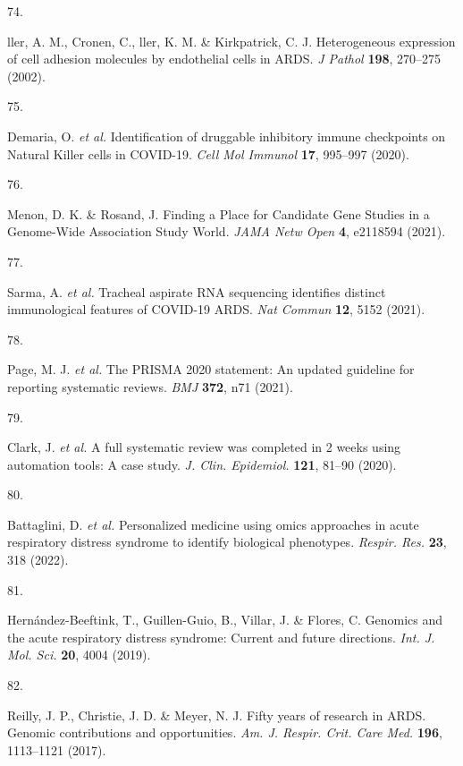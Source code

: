 \documentclass[
  11,
  a4paper,
]{article}
\newlength{\cslhangindent}
\newlength{\csllabelwidth}
\newlength{\cslentryspacingunit} %
\newenvironment{CSLReferences}[2] %
 {%
  \setlength{\parindent}{0pt}
  \ifodd #1
  \let\oldpar\par
  \def\par{\hangindent=\cslhangindent\oldpar}
  \fi
  \setlength{\parskip}{#2\cslentryspacingunit}
 }%
 {}
\newcommand{\CSLLeftMargin}[1]{\parbox[t]{\csllabelwidth}{#1}}
\newcommand{\CSLRightInline}[1]{\parbox[t]{\linewidth - \csllabelwidth}{#1}\break}
\begin{document}
\begin{CSLReferences}{0}{0}
\leavevmode{}%
\CSLLeftMargin{74. }%
\CSLRightInline{ller, A. M., Cronen, C., ller, K. M. \& Kirkpatrick, C.
J. {{H}eterogeneous expression of cell adhesion molecules by endothelial
cells in {A}{R}{D}{S}}. \emph{J Pathol} \textbf{198}, 270--275 (2002).}

\leavevmode{}%
\CSLLeftMargin{75. }%
\CSLRightInline{Demaria, O. \emph{et al.} {{I}dentification of druggable
inhibitory immune checkpoints on {N}atural {K}iller cells in
{C}{O}{V}{I}{D}-19}. \emph{Cell Mol Immunol} \textbf{17}, 995--997
(2020).}

\leavevmode{}%
\CSLLeftMargin{76. }%
\CSLRightInline{Menon, D. K. \& Rosand, J. {{F}inding a {P}lace for
{C}andidate {G}ene {S}tudies in a {G}enome-{W}ide {A}ssociation {S}tudy
{W}orld}. \emph{JAMA Netw Open} \textbf{4}, e2118594 (2021).}

\leavevmode{}%
\CSLLeftMargin{77. }%
\CSLRightInline{Sarma, A. \emph{et al.} {{T}racheal aspirate {R}{N}{A}
sequencing identifies distinct immunological features of
{C}{O}{V}{I}{D}-19 {A}{R}{D}{S}}. \emph{Nat Commun} \textbf{12}, 5152
(2021).}

\leavevmode{}%
\CSLLeftMargin{78. }%
\CSLRightInline{Page, M. J. \emph{et al.} The {PRISMA} 2020 statement:
An updated guideline for reporting systematic reviews. \emph{BMJ}
\textbf{372}, n71 (2021).}

\leavevmode{}%
\CSLLeftMargin{79. }%
\CSLRightInline{Clark, J. \emph{et al.} A full systematic review was
completed in 2 weeks using automation tools: A case study. \emph{J.
Clin. Epidemiol.} \textbf{121}, 81--90 (2020).}

\leavevmode{}%
\CSLLeftMargin{80. }%
\CSLRightInline{Battaglini, D. \emph{et al.} Personalized medicine using
omics approaches in acute respiratory distress syndrome to identify
biological phenotypes. \emph{Respir. Res.} \textbf{23}, 318 (2022).}

\leavevmode{}%
\CSLLeftMargin{81. }%
\CSLRightInline{Hernández-Beeftink, T., Guillen-Guio, B., Villar, J. \&
Flores, C. Genomics and the acute respiratory distress syndrome: Current
and future directions. \emph{Int. J. Mol. Sci.} \textbf{20}, 4004
(2019).}

\leavevmode{}%
\CSLLeftMargin{82. }%
\CSLRightInline{Reilly, J. P., Christie, J. D. \& Meyer, N. J. Fifty
years of research in {ARDS}. Genomic contributions and opportunities.
\emph{Am. J. Respir. Crit. Care Med.} \textbf{196}, 1113--1121 (2017).}


\end{CSLReferences}
\end{document}
